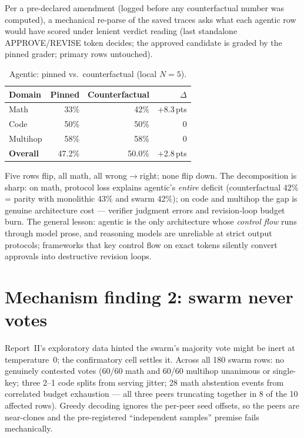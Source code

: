 \documentclass[sigconf,nonacm]{acmart}
\begin{document}
Per a pre-declared amendment (logged before any counterfactual number was computed), a
mechanical re-parse of the saved traces asks what each agentic row would have scored
under lenient verdict reading (last standalone APPROVE/REVISE token decides; the
approved candidate is graded by the pinned grader; primary rows untouched).

\begin{table}[h]
\caption{Agentic: pinned vs.\ counterfactual (local $N{=}5$).}
\label{tab:cf}
\begin{tabular}{lrrr}
\toprule
Domain & Pinned & Counterfactual & $\Delta$\\
\midrule
Math     & 33\% & 42\% & +8.3\,pts\\
Code     & 50\% & 50\% & 0\\
Multihop & 58\% & 58\% & 0\\
\textbf{Overall} & 47.2\% & 50.0\% & +2.8\,pts\\
\bottomrule
\end{tabular}
\end{table}

Five rows flip, all math, all wrong$\to$right; none flip down. The decomposition is
sharp: on math, protocol loss explains agentic's \emph{entire} deficit (counterfactual
42\% = parity with monolithic 43\% and swarm 42\%); on code and multihop the gap is
genuine architecture cost --- verifier judgment errors and revision-loop budget burn.
The general lesson: agentic is the only architecture whose \emph{control flow} runs
through model prose, and reasoning models are unreliable at strict output protocols;
frameworks that key control flow on exact tokens silently convert approvals into
destructive revision loops.

\section{Mechanism finding 2: swarm never votes}
Report~II's exploratory data hinted the swarm's majority vote might be inert at
temperature~0; the confirmatory cell settles it. Across all 180 swarm rows: no
genuinely contested votes (60/60 math and 60/60 multihop unanimous or single-key;
three 2--1 code splits from serving jitter; 28 math abstention events from correlated
budget exhaustion --- all three peers truncating together in 8 of the 10 affected
rows). Greedy decoding ignores the
per-peer seed offsets, so the peers are near-clones and the pre-registered
``independent samples'' premise fails mechanically.
\end{document}
